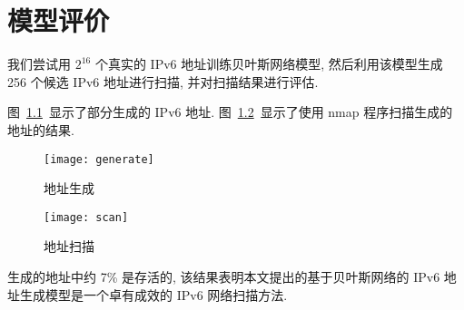 \chapter{模型评价}
\label{cha:evaluation}

我们尝试用 $2^{16}$ 个真实的 IPv6 地址训练贝叶斯网络模型, 然后利用该模型生成 256 个候选 IPv6 地址进行扫描, 并对扫描结果进行评估.

图~\ref{fig:generate}~显示了部分生成的 IPv6 地址. 图~\ref{fig:scan}~显示了使用 nmap 程序扫描生成的地址的结果.

\begin{figure}[htbp]
\centering
\texttt{[image: generate]}
\caption{地址生成}
\label{fig:generate}
\end{figure}

\begin{figure}[htbp]
\centering
\texttt{[image: scan]}
\caption{地址扫描}
\label{fig:scan}
\end{figure}

生成的地址中约 7\% 是存活的, 该结果表明本文提出的基于贝叶斯网络的 IPv6 地址生成模型是一个卓有成效的 IPv6 网络扫描方法.
